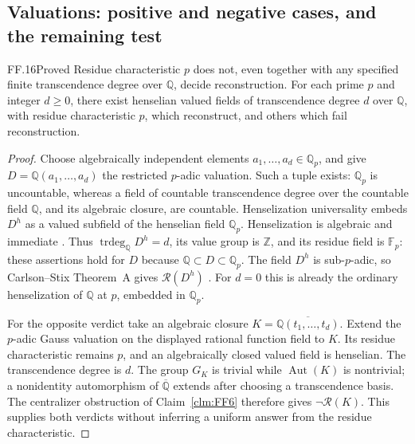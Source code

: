 
\subsection{Valuations: positive and negative cases, and the remaining test}

\begin{claim}{FF.16}{Proved}\label{clm:FFmixed}
Residue characteristic \(p\) does not, even together with any
specified finite transcendence degree over \(\mathbb Q\), decide
reconstruction. For each prime \(p\) and integer \(d\geq0\),
there exist henselian valued fields of transcendence degree \(d\)
over \(\mathbb Q\), with residue characteristic \(p\), which
reconstruct, and others which fail reconstruction.
\end{claim}
\begin{proof}
Choose algebraically independent elements
\(a_1,\ldots,a_d\in\mathbb Q_p\), and give
\(D=\mathbb Q(a_1,\ldots,a_d)\) the restricted \(p\)-adic
valuation. Such a tuple exists: \(\mathbb Q_p\) is uncountable,
whereas a field of countable transcendence degree over the
countable field \(\mathbb Q\), and its algebraic closure, are
countable. Henselization universality embeds \(D^h\) as a
valued subfield of the henselian field \(\mathbb Q_p\).
Henselization is algebraic and immediate
\citep[Proposition~3.3.25, Corollary~3.3.26]{FF_ADH2017}.
Thus \(\operatorname{trdeg}_{\mathbb Q}D^h=d\), its value
group is \(\mathbb Z\), and its residue field is
\(\mathbb F_p\): these assertions hold for \(D\) because
\(\mathbb Q\subset D\subset\mathbb Q_p\).
The field \(D^h\) is sub-\(p\)-adic, so Carlson--Stix
Theorem~A gives \(\mathcal R(D^h)\)
\citep[Theorem~A, Theorem~4.1]{FF_CS2026}.
For \(d=0\) this is already the ordinary henselization of
\(\mathbb Q\) at \(p\), embedded in \(\mathbb Q_p\).

For the opposite verdict take an algebraic closure
\(K=\overline{\mathbb Q(t_1,\ldots,t_d)}\).
Extend the \(p\)-adic Gauss valuation on the displayed rational
function field to \(K\). Its residue characteristic remains
\(p\), and an algebraically closed valued field is henselian.
The transcendence degree is \(d\). The group \(G_K\) is
trivial while \(\operatorname{Aut}(K)\) is nontrivial; a
nonidentity automorphism of \(\overline{\mathbb Q}\) extends
after choosing a transcendence basis. The centralizer obstruction
of Claim~\ref{clm:FF6} therefore gives \(\neg\mathcal R(K)\).
This supplies both verdicts without inferring a uniform answer
from the residue characteristic.
\end{proof}

